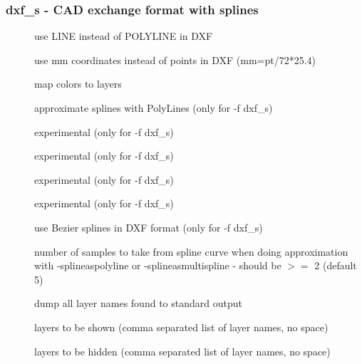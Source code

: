 \documentclass[english,a4paper]{article}
\begin{document}
\subsubsection{dxf\_s - CAD exchange format with splines}
\begin{description}
\item[]
use LINE instead of POLYLINE in DXF


\item[]
use mm coordinates instead of points in DXF (mm=pt/72*25.4)


\item[]
map colors to layers


\item[]
approximate splines with PolyLines (only for -f dxf\_s)


\item[]
experimental (only for -f dxf\_s)


\item[]
experimental (only for -f dxf\_s)


\item[]
experimental (only for -f dxf\_s)


\item[]
experimental (only for -f dxf\_s)


\item[]
use Bezier splines in DXF format (only for -f dxf\_s)


\item[]
number of samples to take from spline curve when doing approximation with -splineaspolyline or -splineasmultispline - should be $>=$ 2 (default 5)


\item[]
dump all layer names found to standard output


\item[]
layers to be shown (comma separated list of layer names, no space)


\item[]
layers to be hidden (comma separated list of layer names, no space)


\end{description}
\end{document}
